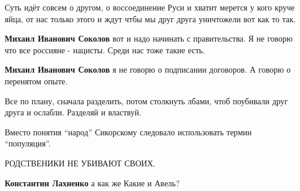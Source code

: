 \begin{itemize}
\begin{itemize}
Суть идёт совсем о другом, о воссоединение Руси и хватит мерется у кого круче
яйца, от нас только этого и ждут чтбы мы друг друга уничтожели вот как то так.

\textbf{Михаил Иванович Соколов} вот и надо начинать с правительства. Я не говорю что все россияне - нацисты. Среди нас тоже такие есть.

\textbf{Михаил Иванович Соколов} я не говорю о подписании договоров. А говорю о перенятом опыте.

\end{itemize} %

Все по плану, сначала разделить, потом столкнуть лбами, чтоб поубивали друг друга и ослабли. Разделяй и властвуй.

Вместо понятия \enquote{народ} Сикорскому следовало использовать термин \enquote{популяция}.

РОДСТВЕНИКИ НЕ УБИВАЮТ СВОИХ.

\begin{itemize} %
\textbf{Константин Лахненко} а как же Какие и Авель?
\end{itemize} %

\end{itemize} %
